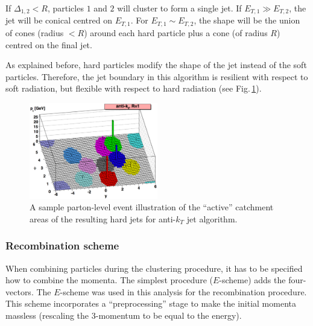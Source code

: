 \documentclass[12pt, twoside]{article}
\numberwithin{equation}{section}
\numberwithin{figure}{section}
\begin{document}
If $\Delta_{1,2} < R$, particles $1$ and $2$ will cluster to form a single jet. If $E_{T,1} \gg E_{T,2}$, the jet will be conical centred on $E_{T,1}$. For $E_{T,1} \sim E_{T,2}$, the shape will be the union of cones (radius $<R$) around each hard particle plus a cone (of radius $R$) centred on the final jet.

As explained before, hard particles modify the shape of the jet instead of the soft particles. Therefore, the jet boundary in this algorithm is resilient with respect to soft radiation, but flexible with respect to hard radiation (see Fig.\,\ref{fig:anti-ktAlgorithm}).

\begin{figure}[h]
    \centering
    \vspace{1.0cm}
    \includegraphics[width=0.5\textwidth]{./images/Jet_Algorithm_anti-kt.pdf}
    \captionsetup{width=0.9\textwidth}
    \caption{A sample parton-level event illustration of the ``active'' catchment areas of the resulting hard jets for anti-$k_{T}$ jet algorithm.}
    \label{fig:anti-ktAlgorithm}
\end{figure}

\subsubsection{Recombination scheme}
\label{subsubsec:RecombinationScheme}

When combining particles during the clustering procedure, it has to be specified how to combine the momenta. The simplest procedure ($E$-scheme) adds the four-vectors. The $E$-scheme was used in this analysis for the recombination procedure. This scheme incorporates a ``preprocessing'' stage to make the initial momenta massless (rescaling the 3-momentum to be equal to the energy).

%
%
\newpage
\thispagestyle{empty}
\end{document}
